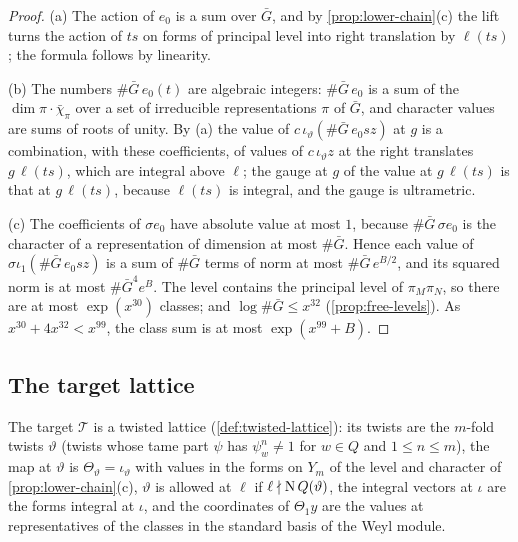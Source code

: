 \begin{proof}
(a) The action of $e_0$ is a sum over $\bar G$, and by \cref{prop:lower-chain}(c) the lift turns the action of $ts$ on forms of principal level into right translation by $\ell(ts)$; the formula follows by linearity.

(b) The numbers $\#\bar G\,e_0(t)$ are algebraic integers: $\#\bar G\,e_0$ is a sum of the $\dim\pi\cdot\bar\chi_\pi$ over a set of irreducible representations $\pi$ of $\bar G$, and character values are sums of roots of unity. By (a) the value of $c\,\iota_\vartheta(\#\bar G\,e_0sz)$ at $g$ is a combination, with these coefficients, of values of $c\,\iota_\vartheta z$ at
the right translates $g\,\ell(ts)$, which are integral above $\ell$; the gauge at $g$ of the value at $g\,\ell(ts)$ is that at $g\,\ell(ts)$, because $\ell(ts)$ is integral, and the gauge is ultrametric.

(c) The coefficients of $\sigma e_0$ have absolute value at most $1$, because $\#\bar G\,\sigma e_0$ is the character of a representation of dimension at most $\#\bar G$. Hence each value of $\sigma\iota_1(\#\bar G\,e_0sz)$ is a sum of $\#\bar G$ terms of norm at most $\#\bar G\,e^{B/2}$, and its squared norm is at most $\#\bar G^4e^B$. The level contains the principal level of
$\pi_M\pi_N$, so there are at most $\exp(x^{30})$ classes; and $\log\#\bar G\le x^{32}$ (\cref{prop:free-levels}). As $x^{30}+4x^{32}<x^{99}$, the class sum is at most $\exp(x^{99}+B)$.
\end{proof}

\subsection{The target lattice}\label{ss:target-lattice}
The target $\mathcal T$ is a twisted lattice (\cref{def:twisted-lattice}): its twists are the $m$-fold twists $\vartheta$ (twists whose tame part
$\psi$ has $\psi_w^n\ne1$ for $w\in Q$ and $1\le n\le m$), the map at $\vartheta$ is $\Theta_\vartheta=\iota_\vartheta$ with values in the forms on $Y_m$ of the level and
character of \cref{prop:lower-chain}(c), $\vartheta$ is allowed at $\ell$ if $\ell\nmid\operatorname{N} Q(\vartheta)$, the integral vectors at $\iota$ are the forms integral at
$\iota$, and the coordinates of $\Theta_1y$ are the values at representatives of the classes in the standard basis of the Weyl module.

